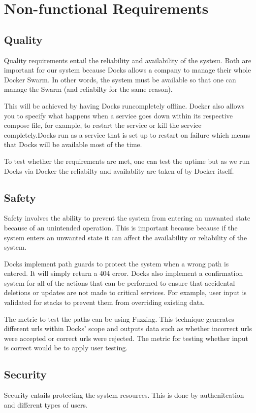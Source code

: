 \documentclass[]{article}
\begin{document}
\section{Non-functional Requirements}
\subsection{Quality}
Quality requirements entail the reliability and availability of the system. Both are important for our system because Docks allows a company to manage their whole Docker Swarm. In other words, the system must be available so that one can manage the Swarm (and reliabilty for the same reason). 

This will be achieved by having Docks runcompletely offline. Docker also allows you to specify what happens when a service goes down within its respective compose file, for example, to restart the service or kill the service completely.Docks run as a service that is set up to restart on failure which means that Docks will be available most of the time.

To test whether the requirements are met, one can test the uptime but as we run Docks via Docker the reliabilty and availablity are taken of by Docker itself.

\subsection{Safety}
Safety involves the ability to prevent the system from entering an unwanted state because of an unintended operation. This is important because because if the system enters an unwanted state it can affect the availability or reliability of the system. 

Docks implement path guards to protect the system when a wrong path is entered. It will simply return a 404 error. Docks also implement a confirmation system for all of the actions that can be performed to ensure that accidental deletions or updates are not made to critical services. For example, user input is validated for stacks to prevent them from overriding existing data.

The metric to test the paths can be using Fuzzing. This technique generates different urls within Docks' scope and outputs data such as whether incorrect urls were accepted or correct urls were rejected. The metric for testing whether input is correct would be to apply user testing.

\subsection{Security}
Security entails protecting the system resources. This is done by authenitcation and different types of users. 
\end{document}
